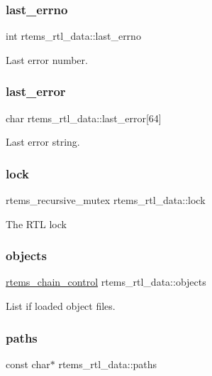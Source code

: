 \subsubsection{\texorpdfstring{last\_errno}{last\_errno}}
{\footnotesize\ttfamily int rtems\+\_\+rtl\+\_\+data\+::last\+\_\+errno}

Last error number. \mbox{\label{structrtems__rtl__data_a4dc4fe750b8cbee1542d5f467d5bbca8}} 
\subsubsection{\texorpdfstring{last\_error}{last\_error}}
{\footnotesize\ttfamily char rtems\+\_\+rtl\+\_\+data\+::last\+\_\+error\mbox{[}64\mbox{]}}

Last error string. \mbox{\label{structrtems__rtl__data_a4bb9f63ecfcc207f9c7bd6e1cfdd544f}} 
\subsubsection{\texorpdfstring{lock}{lock}}
{\footnotesize\ttfamily rtems\+\_\+recursive\+\_\+mutex rtems\+\_\+rtl\+\_\+data\+::lock}

The R\+TL lock \mbox{\label{structrtems__rtl__data_adce98c74f517d66d5214fb2767fe0fe6}} 
\subsubsection{\texorpdfstring{objects}{objects}}
{\footnotesize\ttfamily \mbox{\hyperlink{unionChain__Control}{rtems\+\_\+chain\+\_\+control}} rtems\+\_\+rtl\+\_\+data\+::objects}

List if loaded object files. \mbox{\label{structrtems__rtl__data_ad0fb22f730c79bd6066b2de85f3f81e5}} 
\subsubsection{\texorpdfstring{paths}{paths}}
{\footnotesize\ttfamily const char$\ast$ rtems\+\_\+rtl\+\_\+data\+::paths}

